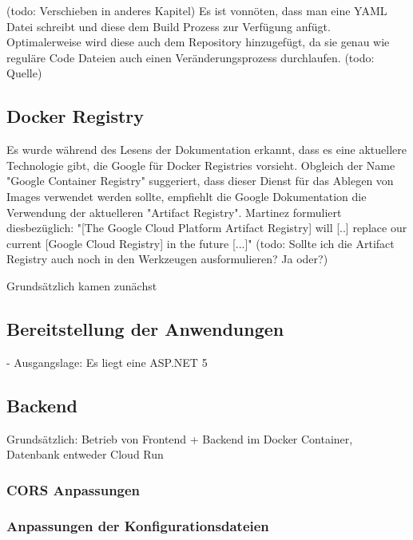 \documentclass[pdftex,a4paper,abstracton,11pt,parskip=half,bibtotocnumbered]{scrartcl}
\begin{document}
	
	(todo: Verschieben in anderes Kapitel) Es ist vonnöten, dass man eine YAML Datei schreibt und diese dem Build Prozess zur Verfügung anfügt. Optimalerweise wird diese auch dem Repository 
	hinzugefügt, da sie genau wie reguläre Code Dateien auch einen Veränderungsprozess durchlaufen. (todo: Quelle)

	\subsection{Docker Registry}
	Es wurde während des Lesens der Dokumentation erkannt, dass es eine aktuellere Technologie gibt, die Google für Docker Registries vorsieht.
	Obgleich der Name "Google Container Registry" suggeriert, dass dieser Dienst für das Ablegen von Images verwendet werden sollte, empfiehlt die Google
	Dokumentation die Verwendung der aktuelleren "Artifact Registry". Martinez formuliert diesbezüglich: "[The Google Cloud Platform Artifact 
	Registry] will [..] replace our current	[Google Cloud Registry] in the future [...]" \cite{artifactRegistryReplacesGCP} 
	(todo: Sollte ich die Artifact Registry auch noch in den Werkzeugen ausformulieren? Ja oder?)

	Grundsätzlich kamen zunächst  
	\subsection{Bereitstellung der Anwendungen}
		- Ausgangslage: Es liegt eine ASP.NET 5 
	

	\subsection{Backend}
	Grundsätzlich: Betrieb von Frontend + Backend im Docker Container, Datenbank entweder 
	Cloud Run
	\subsubsection{CORS Anpassungen}
	\subsubsection{Anpassungen der Konfigurationsdateien}
	
\end{document}

